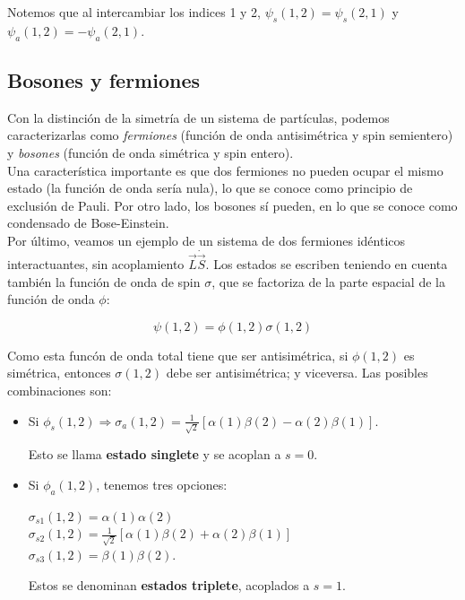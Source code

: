 \documentclass[a4paper]{article}
\begin{document}
Notemos que al intercambiar los indices 1 y 2, $\psi_{s}(1,2) = \psi_{s}(2,1)$ y $\psi_{a}(1,2) = -\psi_{a}(2,1)$.

\subsection{Bosones y fermiones}

Con la distinci\'on de la simetr\'ia de un sistema de part\'iculas, podemos caracterizarlas como \textit{fermiones} (funci\'on de onda antisim\'etrica y spin semientero) y \textit{bosones} (funci\'on de onda sim\'etrica y spin entero).\\

Una caracter\'istica importante es que dos fermiones no pueden ocupar el mismo estado (la funci\'on de onda ser\'ia nula), lo que se conoce como principio de exclusi\'on de Pauli. Por otro lado, los  bosones s\'i pueden, en lo que se conoce como condensado de Bose-Einstein.\\

Por \'ultimo, veamos un ejemplo de un sistema de dos fermiones id\'enticos interactuantes, sin acoplamiento $\vec{L} \dot \vec{S}$. Los estados se escriben teniendo en cuenta tambi\'en la funci\'on de onda de spin $\sigma$, que se factoriza de la parte espacial de la funci\'on de onda $\phi$:

$$\psi(1,2) = \phi(1,2)\sigma(1,2)$$

Como esta func\'on de onda total tiene que ser antisim\'etrica, si $\phi(1,2)$ es sim\'etrica, entonces $\sigma(1,2)$ debe ser antisim\'etrica; y viceversa. Las posibles combinaciones son:

\begin{itemize}
\item Si $\phi_{s}(1,2) \Rightarrow \sigma_{a}(1,2) = \frac{1}{\sqrt{2}}[\alpha(1)\beta(2) - \alpha(2)\beta(1)]$.

Esto se llama \textbf{estado singlete} y se acoplan a $s = 0$.

\item Si $\phi_{a}(1,2)$, tenemos tres opciones:

$\sigma_{s1}(1,2) = \alpha(1)\alpha(2)$\\
$\sigma_{s2}(1,2) = \frac{1}{\sqrt{2}}[\alpha(1)\beta(2) + \alpha(2)\beta(1)]$\\
$\sigma_{s3}(1,2) = \beta(1)\beta(2)$.

Estos se denominan \textbf{estados triplete}, acoplados a $s = 1$.

\end{itemize}
\end{document}

